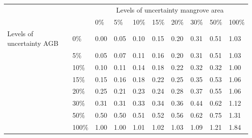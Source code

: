 \documentclass[review, authoryear]{elsarticle}   	%
\begin{document}
\begin{table}[htbp]
   \centering
   \begin{tabular}{p{2.0cm}p{1.0cm}p{1.0cm}p{1.0cm}p{1.0cm}p{1.0cm}p{1.0cm}p{1.0cm}p{1.0cm}p{1.0cm}} %
      \toprule
        &&\multicolumn{8}{c}{Levels of uncertainty mangrove area}\\      
      &&0\%&5\%&10\%&15\%&20\%&30\%&50\%&100\%\\
            \midrule 
Levels of uncertainty AGB&0\%&0.00&0.05&0.10&0.15&0.20&0.31&0.51&1.03\\ 
      &5\%&0.05&0.07&0.11&0.16&0.20&0.31&0.51&1.03\\
     &10\%&0.10&0.11&0.14&0.18&0.22&0.32&0.32&1.00\\
      &15\%&0.15&0.16&0.18&0.22&0.25&0.35&0.53&1.06\\
      &20\%&0.25&0.21&0.23&0.24&0.28&0.37&0.55&1.06\\
     &30\%&0.31&0.31&0.33&0.34&0.36&0.44&0.62&1.12\\
 &50\%&0.50&0.50&0.51&0.52&0.56&0.62&0.75&1.31\\
     &100\%&1.00&1.00&1.01&1.02&1.03&1.09&1.21&1.84\\
               \bottomrule
   \end{tabular}
   \label{tab:sensPacific}
\end{table}
\end{document}
